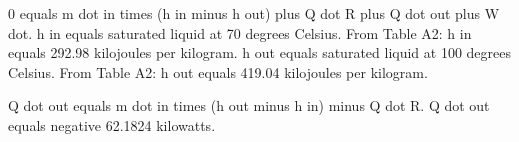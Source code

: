 0 equals m dot in times (h in minus h out) plus Q dot R plus Q dot out plus W dot.  
h in equals saturated liquid at 70 degrees Celsius.  
From Table A2: h in equals 292.98 kilojoules per kilogram.  
h out equals saturated liquid at 100 degrees Celsius.  
From Table A2: h out equals 419.04 kilojoules per kilogram.  

Q dot out equals m dot in times (h out minus h in) minus Q dot R.  
Q dot out equals negative 62.1824 kilowatts.